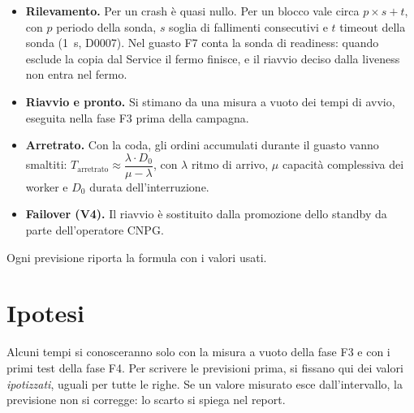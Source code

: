 \begin{itemize}
  \item \textbf{Rilevamento.} Per un crash è quasi nullo. Per un blocco vale circa $p \times s + t$, con $p$ periodo della sonda, $s$ soglia di fallimenti consecutivi e $t$ timeout della sonda (1~s, D0007). Nel guasto F7 conta la sonda di readiness: quando esclude la copia dal Service il fermo finisce, e il riavvio deciso dalla liveness non entra nel fermo.
  \item \textbf{Riavvio e pronto.} Si stimano da una misura a vuoto dei tempi di avvio, eseguita nella fase F3 prima della campagna.
  \item \textbf{Arretrato.} Con la coda, gli ordini accumulati durante il guasto vanno smaltiti: $T_{\text{arretrato}} \approx \dfrac{\lambda \cdot D_0}{\mu - \lambda}$, con $\lambda$ ritmo di arrivo, $\mu$ capacità complessiva dei worker e $D_0$ durata dell'interruzione.
  \item \textbf{Failover (V4).} Il riavvio è sostituito dalla promozione dello standby da parte dell'operatore CNPG.
\end{itemize}

Ogni previsione riporta la formula con i valori usati.

\section{Ipotesi}
\label{sec:ipotesi}

Alcuni tempi si conosceranno solo con la misura a vuoto della fase F3 e con i primi test della fase F4. Per scrivere le previsioni prima, si fissano qui dei valori \emph{ipotizzati}, uguali per tutte le righe. Se un valore misurato esce dall'intervallo, la previsione non si corregge: lo scarto si spiega nel report.

